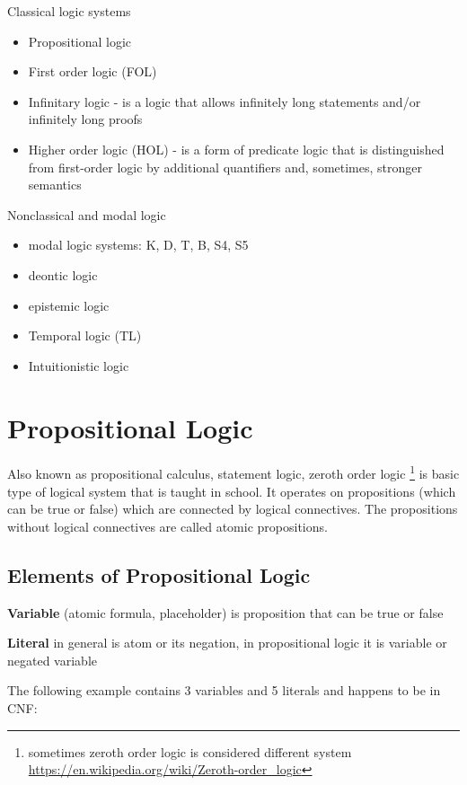 Classical logic systems

\begin{itemize}
  \item Propositional logic 
  \item First order logic (FOL)
  \item Infinitary logic - is a logic that allows infinitely long statements and/or infinitely long proofs
  \item Higher order logic (HOL) - is a form of predicate logic that is distinguished from first-order logic by additional quantifiers and, sometimes, stronger semantics
\end{itemize}

Nonclassical and modal logic
\begin{itemize}
  \item modal logic systems: K, D, T, B, S4, S5
  \item deontic logic 
  \item epistemic logic
  \item Temporal logic (TL)
  \item Intuitionistic logic 
\end{itemize}

\section{Propositional Logic}
Also known as propositional calculus, statement logic, zeroth order logic \footnote{sometimes zeroth order logic is considered different system \url{https://en.wikipedia.org/wiki/Zeroth-order_logic}} is basic type of logical system that is taught in school. It operates on propositions (which can be true or false) which are connected by logical connectives. The propositions without logical connectives are called atomic propositions.

\subsection{Elements of Propositional Logic}

\textbf{Variable} (atomic formula, placeholder) is proposition that can be true or false

\textbf{Literal} in general is atom or its negation, in propositional logic it is variable or negated variable

The following example contains 3 variables and 5 literals and happens to be in \gls{CNF}:

